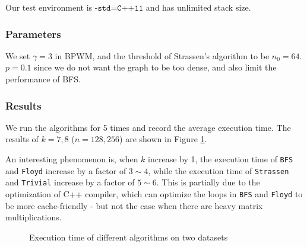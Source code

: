 \documentclass[12pt]{article}
\begin{document}
Our test environment is $\texttt{-std=C++11}$ and has unlimited stack size. 

\subsubsection{Parameters}

We set $\gamma=3$ in BPWM, and the threshold of Strassen's algorithm to be $n_0=64$. $p=0.1$ since we do not want the graph to be too dense, and also limit the performance of BFS.

\subsubsection{Results}

We run the algorithms for 5 times and record the average execution time. The results of $k=7,8$ ($n=128,256$) are shown in Figure \ref{fig:et}. 

An interesting phenomenon is, when $k$ increase by 1, the execution time of \texttt{BFS} and \texttt{Floyd} increase by a factor of $3\sim 4$, while the execution time of \texttt{Strassen} and \texttt{Trivial} increase by a factor of $5\sim 6$. This is partially due to the optimization of C++ compiler, which can optimize the loops in \texttt{BFS} and \texttt{Floyd} to be more cache-friendly - but not the case when there are heavy matrix multiplications.

\begin{figure}[h]
    \centering
    \caption{Execution time of different algorithms on two datasets}
    \label{fig:et}
\end{figure}
\end{document}

